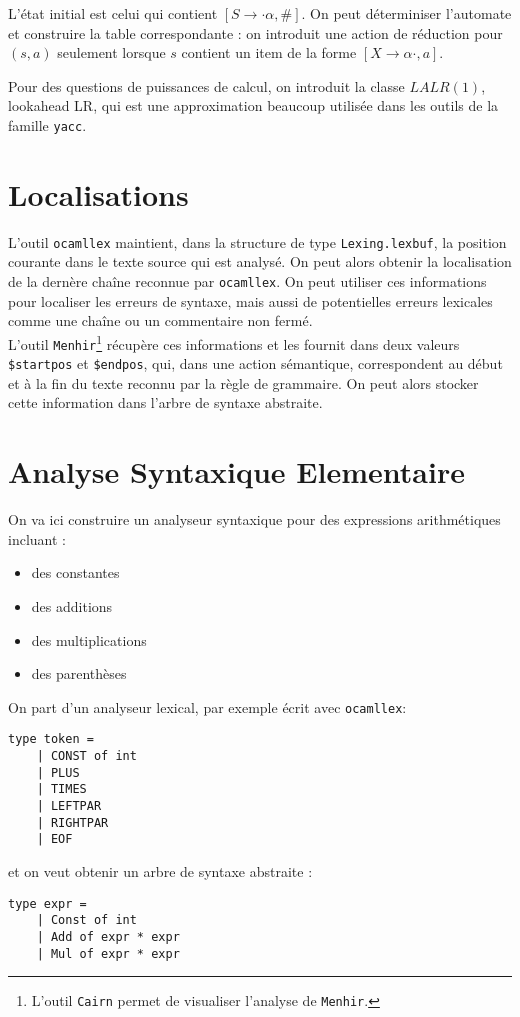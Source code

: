 \documentclass{cours}
\begin{document}
L'état initial est celui qui contient $\left[S \rightarrow \cdot \alpha, \#\right]$. On peut déterminiser l'automate et construire la table correspondante : on introduit une action de réduction pour $(s, a)$ seulement lorsque $s$ contient un item de la forme $\left[X \rightarrow \alpha\cdot, a\right]$.

Pour des questions de puissances de calcul, on introduit la classe $LALR(1)$, lookahead LR, qui est une approximation beaucoup utilisée dans les outils de la famille \texttt{yacc}.

\newpage
\section{Localisations}
L'outil \texttt{ocamllex} maintient, dans la structure de type \texttt{Lexing.lexbuf}, la position courante dans le texte source qui est analysé. On peut alors obtenir la localisation de la dernère chaîne reconnue par \texttt{ocamllex}. On peut utiliser ces informations pour localiser les erreurs de syntaxe, mais aussi de potentielles erreurs lexicales comme une chaîne ou un commentaire non fermé.\\
L'outil \texttt{Menhir}\footnote{L'outil \texttt{Cairn} permet de visualiser l'analyse de \texttt{Menhir}.} récupère ces informations et les fournit dans deux valeurs \texttt{\$startpos} et \texttt{\$endpos}, qui, dans une action sémantique, correspondent au début et à la fin du texte reconnu par la règle de grammaire. On peut alors stocker cette information dans l'arbre de syntaxe abstraite.

\section{Analyse Syntaxique Elementaire}
On va ici construire un analyseur syntaxique pour des expressions arithmétiques incluant :
\begin{itemize}
    \item des constantes
    \item des additions
    \item des multiplications
    \item des parenthèses
\end{itemize}
On part d'un analyseur lexical, par exemple écrit avec \texttt{ocamllex}:
\begin{verbatim}
type token =
    | CONST of int
    | PLUS
    | TIMES
    | LEFTPAR
    | RIGHTPAR
    | EOF
\end{verbatim}
et on veut obtenir un arbre de syntaxe abstraite :
\begin{verbatim}
type expr =
    | Const of int
    | Add of expr * expr
    | Mul of expr * expr
\end{verbatim}
\end{document}

